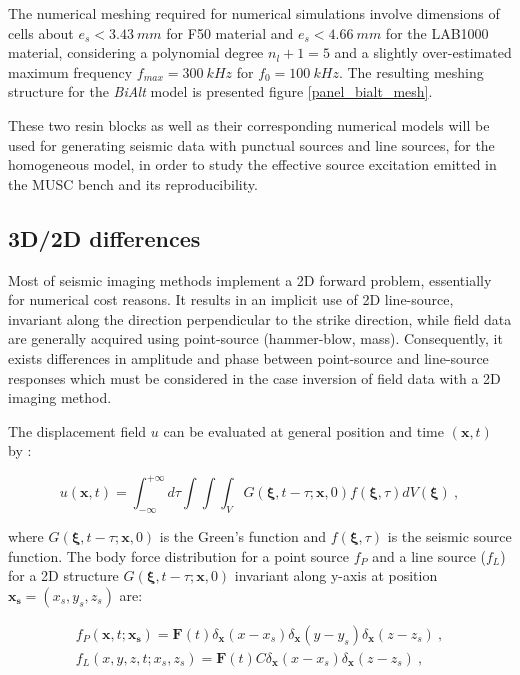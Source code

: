 \documentclass[manuscript,revised]{geophysics}
\newcommand{\bialt}{\textit{BiAlt} }
\begin{document}
\noindent The numerical meshing required for numerical simulations involve dimensions of cells about $e_{s}<3.43\ mm$ for F50 material and $e_{s}<4.66\ mm$ for the LAB1000 material, considering a polynomial degree $n_{l}+1=5$ and a slightly over-estimated maximum frequency $f_{max}=300\ kHz$ for $f_{0}=100\ kHz$. The resulting meshing structure for the \bialt model is presented figure \ref{panel_bialt_mesh}.

\noindent These two resin blocks as well as their corresponding numerical models will be used for generating seismic data with punctual sources and line sources, for the homogeneous model, in order to study the effective source excitation emitted in the MUSC bench and its reproducibility.

\subsection{3D/2D differences}

\noindent Most of seismic imaging methods implement a 2D forward problem, essentially for numerical cost reasons. It results in an implicit use of 2D line-source, invariant along the direction perpendicular to the strike direction, while field data are generally acquired using point-source (hammer-blow, mass). Consequently, it exists differences in amplitude and phase between point-source and line-source responses which must be considered in the case inversion of field data with a 2D imaging method.  

\noindent The displacement field $u$ can be evaluated at general position and time $(\mathbf{x},t)$ by \citep{aki2002quantitative}:

\begin{equation}
	u(\mathbf{x},t) = \int_{-\infty}^{+\infty}d\tau \int \int \int_{V} G(\mathbf{\xi},t-\tau;\mathbf{x},0)f(\mathbf{\xi},\tau)dV(\mathbf{\xi})\ ,
	\label{eq:displacement}
\end{equation}

\noindent where $G(\mathbf{\xi},t-\tau;\mathbf{x},0)$ is the Green's function and $f(\mathbf{\xi},\tau)$ is the seismic source function. The body force distribution for a point source $f_{P}$ and a line source ($f_{L}$) for a 2D structure $G(\mathbf{\xi},t-\tau;\mathbf{x},0)$ invariant along y-axis at position $ \mathbf{x_{s}}=(x_{s}, y_{s},z_{s}) $ are:

\begin{eqnarray} 
	f_{P}(\mathbf{x},t;\mathbf{x_{s}})=\mathbf{F}(t)\delta_{\mathbf{x}}(x-x_{s})\delta_{\mathbf{x}}(y-y_{s})\delta_{\mathbf{x}}(z-z_{s})\ , \label{eq:point-force} \\
	f_{L}(x,y,z,t;x_{s},z_{s})=\mathbf{F}(t) C \delta_{\mathbf{x}}(x-x_{s})\delta_{\mathbf{x}}(z-z_{s})\ , \label{eq:line-force}
\end{eqnarray}
\end{document}
